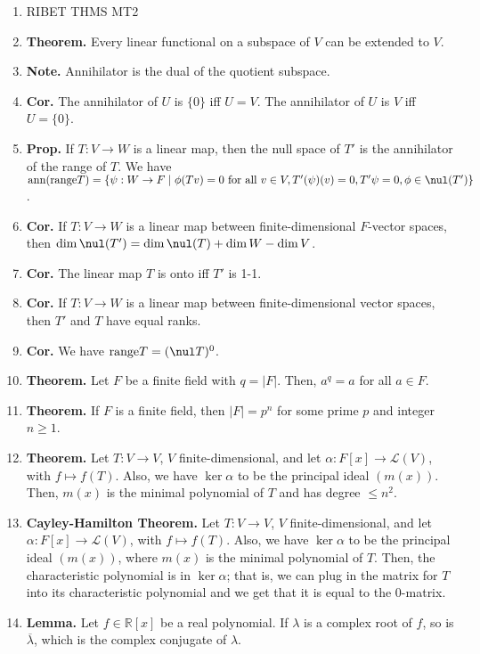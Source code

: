 \begin{enumerate}
\begin{center}
		\hrule
	\end{center}
	\item RIBET THMS MT2
	\item \textbf{Theorem. } Every linear functional on a subspace of $V$ can be extended to $V$. 
	\item \textbf{Note. } Annihilator is the dual of the quotient subspace. 
	\item \textbf{Cor. } The annihilator of $U$ is $\{0\}$ iff $U = V$. The annihilator of $U$ is $V$ iff $U = \{0\}$. 
	\item \textbf{Prop. } If $T: V \to W$ is a linear map, then the null space of $T'$ is the annihilator of the range of $T$. We have $\textrm{ann}(\textrm{range}T) = \{\psi: W \to F \mid \phi(Tv)=0 \textrm{ for all } v \in V, T'(\psi)(v)=0, T'\psi = 0, \phi \in \nul(T')\}$. 
	\item \textbf{Cor. } If $T: V \to W$ is a linear map between finite-dimensional $F$-vector spaces, then $\dim \nul(T') = \dim \nul(T) + \dim W - \dim V$. 
	\item \textbf{Cor. } The linear map $T$ is onto iff $T'$ is 1-1. 
	\item \textbf{Cor. } If $T: V \to W$ is a linear map between finite-dimensional vector spaces, then $T'$ and $T$ have equal ranks. 
	\item \textbf{Cor. } We have $\textrm{range}T = (\nul T)^0$. 
	\item \textbf{Theorem. } Let $F$ be a finite field with $q = |F|$. Then, $a^q=a$ for all $a \in F$. 
	\item \textbf{Theorem. } If $F$ is a finite field, then $|F|=p^n$ for some prime $p$ and integer $n \geq 1$. 
	\item \textbf{Theorem. } Let $T: V \to V$, $V$ finite-dimensional, and let $\alpha: F[x] \to \mathscr{L}(V)$, with $f \mapsto f(T)$. Also, we have $\ker\alpha$ to be the principal ideal $(m(x))$. Then, $m(x)$ is the minimal polynomial of $T$ and has degree $\leq n^2$. 
	\item \textbf{Cayley-Hamilton Theorem. } Let $T: V \to V$, $V$ finite-dimensional, and let $\alpha: F[x] \to \mathscr{L}(V)$, with $f \mapsto f(T)$. Also, we have $\ker\alpha$ to be the principal ideal $(m(x))$, where $m(x)$ is the minimal polynomial of $T$. Then, the characteristic polynomial is in $\ker\alpha$; that is, we can plug in the matrix for $T$ into its characteristic polynomial and we get that it is equal to the 0-matrix. 
	\item \textbf{Lemma. } Let $f \in \mathbb{R}[x]$ be a real polynomial. If $\lambda$ is a complex root of $f$, so is $\overline{\lambda}$, which is the complex conjugate of $\lambda$. 

\end{enumerate}
